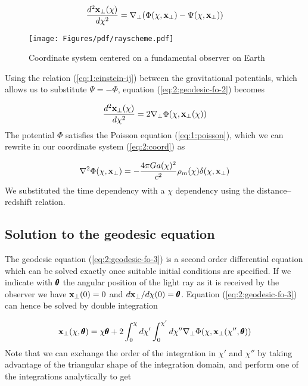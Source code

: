 \begin{equation}
\label{eq:2:geodesic-fo-2}
\frac{d^2\mathbf{x}_\perp(\chi)}{d\chi^2} = \nabla_\perp(\Phi(\chi,\mathbf{x}_\perp)-\Psi(\chi,\mathbf{x}_\perp))
\end{equation}
%
\begin{figure}
\begin{center}
\texttt{[image: Figures/pdf/rayscheme.pdf]}
\end{center}
\caption{Coordinate system centered on a fundamental observer on Earth}
\label{fig:2:scheme}
\end{figure}
%
Using the relation (\ref{eq:1:einstein-ij}) between the gravitational potentials, which allows us to substitute $\Psi=-\Phi$, equation (\ref{eq:2:geodesic-fo-2}) becomes 

\begin{equation}
\label{eq:2:geodesic-fo-3}
\frac{d^2\mathbf{x}_\perp(\chi)}{d\chi^2} = 2\nabla_\perp\Phi(\chi,\mathbf{x}_\perp(\chi))
\end{equation}
%
The potential $\Phi$ satisfies the Poisson equation (\ref{eq:1:poisson}), which we can rewrite in our coordinate system (\ref{eq:2:coord}) as

\begin{equation}
\label{eq:2:poisson}
\nabla^2\Phi(\chi,\mathbf{x}_\perp) = -\frac{4\pi Ga(\chi)^2}{c^2}\rho_m(\chi)\delta(\chi,\mathbf{x}_\perp)
\end{equation} 
%
We substituted the time dependency with a $\chi$ dependency using the distance--redshift relation. 

\subsection{Solution to the geodesic equation}
The geodesic equation (\ref{eq:2:geodesic-fo-3}) is a second order differential equation which can be solved exactly once suitable initial conditions are specified. If we indicate with $\pmb{\theta}$ the angular position of the light ray as it is received by the observer we have $\mathbf{x}_\perp(0)=0$ and $d\mathbf{x}_\perp /d\chi(0)=\pmb{\theta}$. Equation (\ref{eq:2:geodesic-fo-3}) can hence be solved by double integration

\begin{equation}
\label{eq:2:geosol-1}
\mathbf{x}_\perp(\chi,\pmb{\theta}) = \chi\pmb{\theta} + 2\int_0^\chi d\chi'\int_0^{\chi'}d\chi'' \nabla_\perp\Phi(\chi,\mathbf{x}_\perp(\chi'',\pmb{\theta}))
\end{equation} 
%
Note that we can exchange the order of the integration in $\chi'$ and $\chi''$ by taking advantage of the triangular shape of the integration domain, and perform one of the integrations analytically to get


